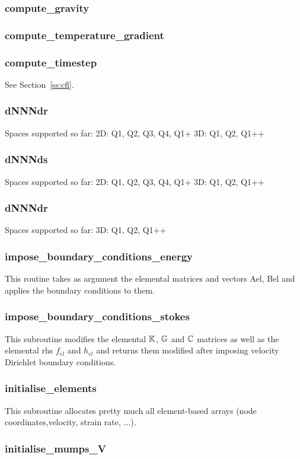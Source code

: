  \subsubsection{compute\_gravity}

 \subsubsection{compute\_temperature\_gradient}

 \subsubsection{compute\_timestep}
 See Section~\ref{ss:cfl}.
 \subsubsection{dNNNdr}
 Spaces supported so far:
 2D: Q1, Q2, Q3, Q4, Q1+
 3D: Q1, Q2, Q1++
 \subsubsection{dNNNds}
 Spaces supported so far:
 2D: Q1, Q2, Q3, Q4, Q1+
 3D: Q1, Q2, Q1++
 \subsubsection{dNNNdr}
 Spaces supported so far:
 3D: Q1, Q2, Q1++
 \subsubsection{impose\_boundary\_conditions\_energy}
 This routine takes as argument the elemental matrices and vectors Ael, Bel
 and applies the boundary conditions to them.
 \subsubsection{impose\_boundary\_conditions\_stokes}
 This subroutine modifies the elemental ${\mathbb{K}}$, ${\mathbb{G}}$ and ${\mathbb{C}}$ matrices as well as the 
 elemental rhs $f_{el}$ and $h_{el}$ and returns them modified after imposing
 velocity Dirichlet boundary conditions.
 \subsubsection{initialise\_elements}
 This subroutine allocates pretty much all element-based arrays (node coordinates,velocity,
 strain rate, ...).
 \subsubsection{initialise\_mumps\_V}

